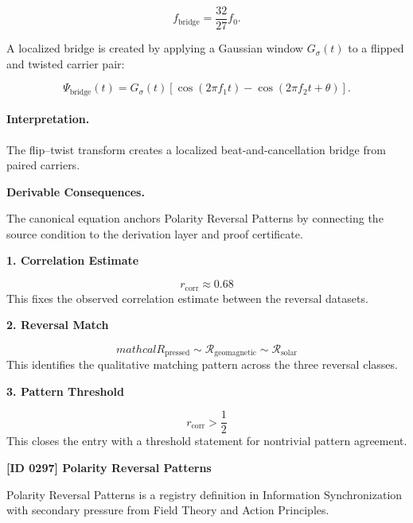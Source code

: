 \begin{equation}
f_{\mathrm{bridge}}=\frac{32}{27}f_0.
\end{equation}

A localized bridge is created by applying a Gaussian window $G_\sigma(t)$ to a flipped and twisted carrier pair:

\begin{equation}
\boxed{
\Psi_{\mathrm{bridge}}(t)
=
G_{\sigma}(t)
\left[
\cos(2\pi f_1t)
-
\cos(2\pi f_2t+\theta)
\right].
}
\end{equation}

\paragraph{Interpretation.}
The flip--twist transform creates a localized beat-and-cancellation bridge from paired carriers.

\par\vspace{0.35em}
\noindent\textbf{Derivable Consequences.}\quad
\begingroup
\footnotesize
\raggedright
The canonical equation anchors Polarity Reversal Patterns by connecting the source condition to the derivation layer and proof certificate.
\par\endgroup

\noindent\textbf{1. Correlation Estimate}\par
\[
r_{\mathrm{corr}} \approx 0.68
\]
\noindent This fixes the observed correlation estimate between the reversal datasets.\par
\noindent\textbf{2. Reversal Match}\par
\[
mathcal{R}_{\mathrm{pressed}} \sim \mathcal{R}_{\mathrm{geomagnetic}} \sim \mathcal{R}_{\mathrm{solar}}
\]
\noindent This identifies the qualitative matching pattern across the three reversal classes.\par
\noindent\textbf{3. Pattern Threshold}\par
\[
r_{\mathrm{corr}} > \frac{1}{2}
\]
\noindent This closes the entry with a threshold statement for nontrivial pattern agreement.\par

\clearpage
\noindent\textbf{[ID 0297] Polarity Reversal Patterns}\par
\vspace{0.35em}
\begingroup\small
{}
Polarity Reversal Patterns is a registry definition in Information Synchronization with secondary pressure from Field Theory and Action Principles.

